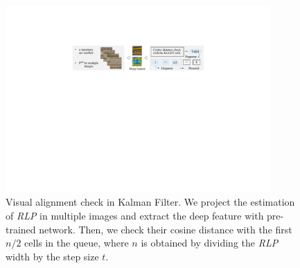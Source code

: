 \begin{figure}
    \centering
    \includegraphics[width=0.9\textwidth]{images/visualCheck.pdf}
    \caption{Visual alignment check in Kalman Filter.
    We project the estimation of \textit{RLP} in multiple images and extract the deep feature with pre-trained network.
    Then, 
    we check their cosine distance with the first $n/2$ cells in the queue,
    where $n$ is obtained by dividing the \textit{RLP} width by the step size $t$.}
    \label{fig_visualCheck}
\end{figure}







